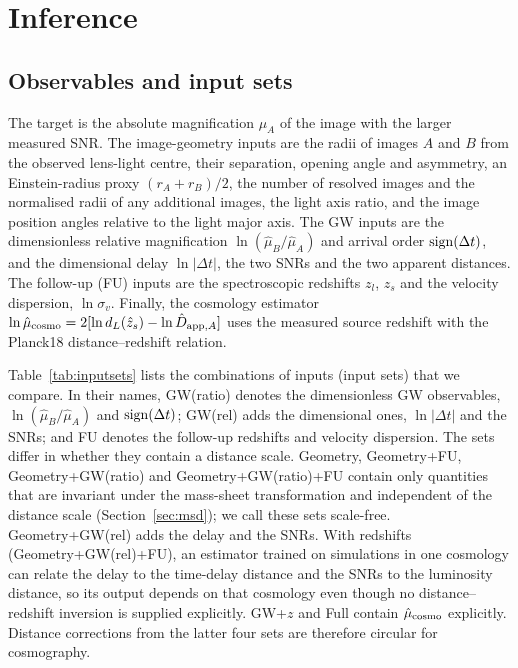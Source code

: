 \section{Inference}
\label{sec:inference}
\subsection{Observables and input sets}
\label{sec:features}
The target is the absolute magnification $\mu_A$ of the image with the larger measured SNR. The image-geometry inputs are the radii of images $A$ and $B$ from the observed lens-light centre, their separation, opening angle and asymmetry, an Einstein-radius proxy $(r_A+r_B)/2$, the number of resolved images and the normalised radii of any additional images, the light axis ratio, and the image position angles relative to the light major axis. The GW inputs are the dimensionless relative magnification $\ln(\hat\mu_B/\hat\mu_A)$ and arrival order ${\rm sign}(\Delta t)$, and the dimensional delay $\ln|\Delta t|$, the two SNRs and the two apparent distances. The follow-up (FU) inputs are the spectroscopic redshifts $z_l$, $z_s$ and the velocity dispersion, $\ln\sigma_v$. Finally, the cosmology estimator $\ln\hat\mu_{\rm cosmo}=2[\ln d_L(\hat z_s)-\ln\hat D_{{\rm app},A}]$ uses the measured source redshift with the Planck18 distance--redshift relation.

Table~\ref{tab:inputsets} lists the combinations of inputs (input sets) that we compare. In their names, GW(ratio) denotes the dimensionless GW observables, $\ln(\hat\mu_B/\hat\mu_A)$ and ${\rm sign}(\Delta t)$; GW(rel) adds the dimensional ones, $\ln|\Delta t|$ and the SNRs; and FU denotes the follow-up redshifts and velocity dispersion. The sets differ in whether they contain a distance scale. Geometry, Geometry+FU, Geometry+GW(ratio) and Geometry+GW(ratio)+FU contain only quantities that are invariant under the mass-sheet transformation and independent of the distance scale (Section~\ref{sec:msd}); we call these sets scale-free. Geometry+GW(rel) adds the delay and the SNRs. With redshifts (Geometry+GW(rel)+FU), an estimator trained on simulations in one cosmology can relate the delay to the time-delay distance and the SNRs to the luminosity distance, so its output depends on that cosmology even though no distance--redshift inversion is supplied explicitly. GW+$z$ and Full contain $\hat\mu_{\rm cosmo}$ explicitly. Distance corrections from the latter four sets are therefore circular for cosmography.

